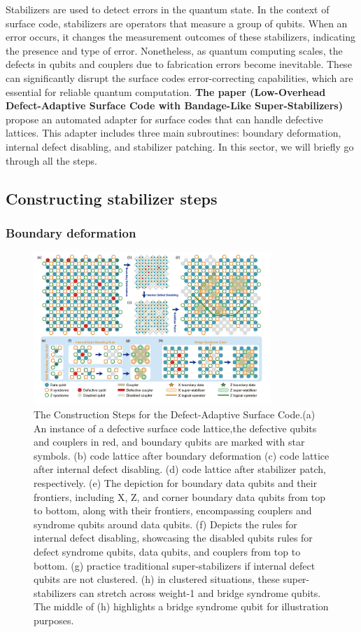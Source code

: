 Stabilizers are used to detect errors in the quantum state. In the context of surface code, stabilizers are operators that measure a group of qubits. When an error occurs, it changes the measurement outcomes of these stabilizers, indicating the presence and type of error. Nonetheless, as quantum computing scales, the defects in qubits and couplers due to fabrication errors become inevitable. These can significantly disrupt the surface codes error-correcting capabilities, which are essential for reliable quantum computation. \textbf{The paper (Low-Overhead Defect-Adaptive Surface Code with Bandage-Like Super-Stabilizers)} propose an automated adapter for surface codes that can handle defective lattices. This adapter includes three main subroutines: boundary deformation, internal defect disabling, and stabilizer patching. In this sector, we will briefly go through all the steps.

\subsection{Constructing stabilizer steps}
\subsubsection{Boundary deformation}

\begin{figure}[h]
    \centering
    \includegraphics[width=0.8\textwidth]{sections/4_stabilizer/Fig1.png}
    \caption{The Construction Steps for the Defect-Adaptive Surface Code.(a) An instance of a defective surface code lattice,the defective qubits and couplers in red, and boundary qubits are marked with star symbols. (b) code lattice after boundary deformation (c) code lattice after internal defect disabling. (d) code lattice after stabilizer patch, respectively. (e) The depiction for boundary data qubits and their frontiers, including X, Z, and corner boundary data qubits from top to bottom, along with their frontiers, encompassing couplers and syndrome qubits around data qubits. (f) Depicts the rules for internal defect disabling, showcasing the disabled qubits rules for defect syndrome qubits, data qubits, and couplers from top to bottom. (g) practice traditional super-stabilizers if internal defect qubits are not clustered. (h) in clustered situations, these super-stabilizers can stretch across weight-1 and bridge syndrome qubits. The middle of (h) highlights a bridge syndrome qubit for illustration purposes.}
    \label{fig:Fig1}
\end{figure}

